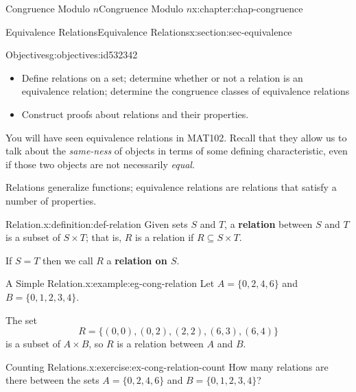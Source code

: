 \documentclass[oneside,10pt,]{book}
\newcommand{\terminology}[1]{\textbf{#1}}
\numberwithin{equation}{section}
\begin{document}
\begin{chapterptx}{Congruence Modulo \(n\)}{}{Congruence Modulo \(n\)}{}{}{x:chapter:chap-congruence}
%
%
\typeout{************************************************}
\typeout{************************************************}
%
\begin{sectionptx}{Equivalence Relations}{}{Equivalence Relations}{}{}{x:section:sec-equivalence}
\begin{objectives}{Objectives}{g:objectives:id532342}
%
\begin{itemize}[label=\textbullet]
\item{}Define relations on a set; determine whether or not a relation is an equivalence relation; determine the congruence classes of equivalence relations%
\item{}Construct proofs about relations and their properties.%
\end{itemize}
\end{objectives}
You will have seen equivalence relations in MAT102. Recall that they allow us to talk about the \emph{same-ness} of objects in terms of some defining characteristic, even if those two objects are not necessarily \emph{equal}.%
\par
Relations generalize functions; equivalence relations are relations that satisfy a number of properties.%
\begin{definition}{Relation.}{x:definition:def-relation}%
Given sets \(S\) and \(T\), a \terminology{relation} between \(S\) and \(T\) is a subset of \(S \times T\); that is, \(R\) is a relation if \(R \subseteq S \times T\).%
\par
If \(S = T\) then we call \(R\) a \terminology{relation on \(S\)}.%
\end{definition}
\begin{example}{A Simple Relation.}{x:example:eg-cong-relation}%
Let \(A = \{0,2,4,6\}\) and \(B = \{0,1,2,3,4\}\).%
\par
The set%
\begin{equation*}
R = \{(0,0),(0,2),(2,2),(6,3),(6,4)\}
\end{equation*}
is a subset of \(A \times B\), so \(R\) is a relation between \(A\) and \(B\).%
\end{example}
\begin{inlineexercise}{Counting Relations.}{x:exercise:ex-cong-relation-count}%
How many relations are there between the sets \(A = \{0,2,4,6\}\) and \(B = \{0,1,2,3,4\}\)?%
\par\smallskip%

\end{inlineexercise}
\end{sectionptx}
\end{chapterptx}
\end{document}
